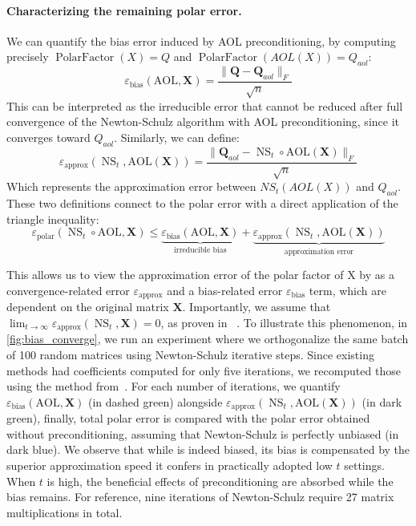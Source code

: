 \paragraph{Characterizing the remaining polar error.}
We can quantify the bias error induced by AOL preconditioning, by computing precisely $\operatorname{PolarFactor}(X) = Q$ and $\operatorname{PolarFactor}(AOL(X)) = Q_{aol}$:
\[
    \varepsilon_{\text{bias}}(\mathrm{AOL}, \mathbf{X}) = \frac{\| \textbf{Q} - \textbf{Q}_{aol} \|_F}{\sqrt{n}}
\]
This can be interpreted as the irreducible error that cannot be reduced after full convergence of the Newton-Schulz algorithm with AOL preconditioning, since it converges toward $Q_{aol}$.
Similarly, we can define:
\[
    \varepsilon_{\text{approx}}(\operatorname{NS}_t, \textrm{AOL}(\mathbf{X})) = \frac{\|  \textbf{Q}_{aol} - \operatorname{NS}_t\circ\textrm{AOL}(\mathbf{X}) \|_F}{\sqrt{n}}
\]
Which represents the approximation error between $NS_t(AOL(X))$ and $Q_{aol}$.
These two definitions connect to the polar error with a direct application of the triangle inequality:
\[
    \varepsilon_{\text{polar}}(\operatorname{NS}_t\circ\textrm{AOL}, \mathbf{X}) \leq  
    \underbrace{\varepsilon_{\text{bias}}(\textrm{AOL}, \mathbf{X})}_{\text{irreducible bias}} + 
    \underbrace{\varepsilon_{\text{approx}}(\operatorname{NS}_t, \textrm{AOL}(\mathbf{X}))}_{\text{approximation error}}
\]

This allows us to view the approximation error of the polar factor of X by \turbomuon as a convergence-related error $\varepsilon_\text{approx}$ and a bias-related error $\varepsilon_\text{bias}$ term, which are dependent on the original matrix $\mathbf{X}$. Importantly, we assume that $\lim_{t\to\infty} \varepsilon_\text{approx}(\operatorname{NS}_t, \mathbf{X}) = 0$, as proven in ~\cite{bjorck1971iterative}. To illustrate this phenomenon, in \cref{fig:bias_converge}, we run an experiment where we orthogonalize the same batch of 100 random matrices using Newton-Schulz iterative steps. Since existing methods had coefficients computed for only five iterations, we recomputed those using the method from~\citet{amsel2025polar}. 
For each number of iterations, we quantify $\varepsilon_{\text{bias}}(\textrm{AOL}, \mathbf{X})$ (in dashed green) alongside $\varepsilon_{\text{approx}}(\operatorname{NS}_t, \textrm{AOL}(\mathbf{X}))$ (in dark green), finally, total polar error is compared with the polar error obtained without preconditioning, assuming that Newton-Schulz is perfectly unbiased (in dark blue).
We observe that while \turbomuon is indeed biased, its bias is compensated by the superior approximation speed it confers in practically adopted low $t$ settings. When $t$ is high, the beneficial effects of preconditioning are absorbed while the bias remains. For reference, nine iterations of Newton-Schulz require 27 matrix multiplications in total.


